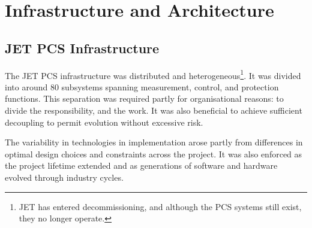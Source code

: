 \documentclass[preprint]{elsarticle}
\begin{document}

%
%





\section{Infrastructure and Architecture}

\subsection{JET PCS Infrastructure}
\label{l_infrastructure}

The JET PCS infrastructure was distributed and
heterogeneous\footnote{JET has entered decommissioning, and although the PCS systems still exist, they no longer operate.}.  
It was divided into around 80 subsystems spanning measurement, control, and protection functions.
This separation was required partly for organisational reasons: to divide the responsibility, and the work.
It was also beneficial to achieve sufficient decoupling to permit evolution without excessive risk.

The variability in technologies in implementation arose partly from differences in
optimal design choices and constraints across the project.  It was also enforced
as the project lifetime extended and as generations of software and hardware
evolved through industry cycles.
\end{document}
